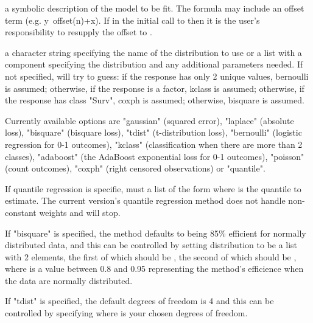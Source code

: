 \begin{Arguments}
\begin{ldescription}
\item[\code{formula}] a symbolic description of the model to be fit. The formula may 
include an offset term (e.g. y~offset(n)+x). If  in 
the initial call to  then it is the user's responsibility to 
resupply the offset to .
\item[\code{distribution}] a character string specifying the name of the distribution 
to use or a list with a component  specifying the distribution 
and any additional parameters needed. If not specified,  will
try to guess: if the response has only 2 unique values, bernoulli is
assumed; otherwise, if the response is a factor, kclass is assumed; otherwise,
if the response has class "Surv", coxph is assumed; otherwise, bisquare
is assumed.

Currently available options are "gaussian" (squared error), "laplace"
(absolute loss), "bisquare" (bisquare loss), "tdist" (t-distribution loss),
"bernoulli" (logistic regression for 0-1 outcomes), 
"kclass" (classification when there are more than 2 classes),
"adaboost" (the AdaBoost exponential loss for 0-1 outcomes), "poisson" 
(count outcomes), "coxph" (right censored observations) or "quantile".

If quantile regression is specifie,  must a list of the form 
 where  is the quantile 
to estimate. The current version's  quantile regression method does
not handle non-constant weights and will stop.

If "bisquare" is specified, the method defaults to being
85\% efficient for normally distributed data, and this can be controlled
by setting distribution to be a list with 2 elements, the first of which
should be , the second of which should be
, where
 is a value between 0.8 and 0.95 representing the method's
efficience when the data are normally distributed.

If "tdist" is specified,
the default
degrees of freedom is 4 and this can be controlled by specifying
 where  is your chosen degrees of freedom.


\end{ldescription}
\end{Arguments}
